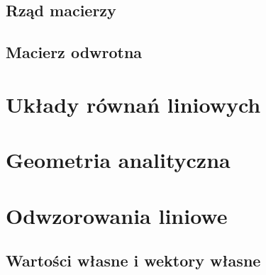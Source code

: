 \documentclass[11pt]{scrartcl}
\begin{document}
        \subsection{Rząd macierzy}
        

        \subsection{Macierz odwrotna}
        

    \section{Układy równań liniowych}
    

    \section{Geometria analityczna}
    

    \section{Odwzorowania liniowe} \label{s:linear map}
    

        \subsection{Wartości własne i wektory własne}
        
\end{document}

